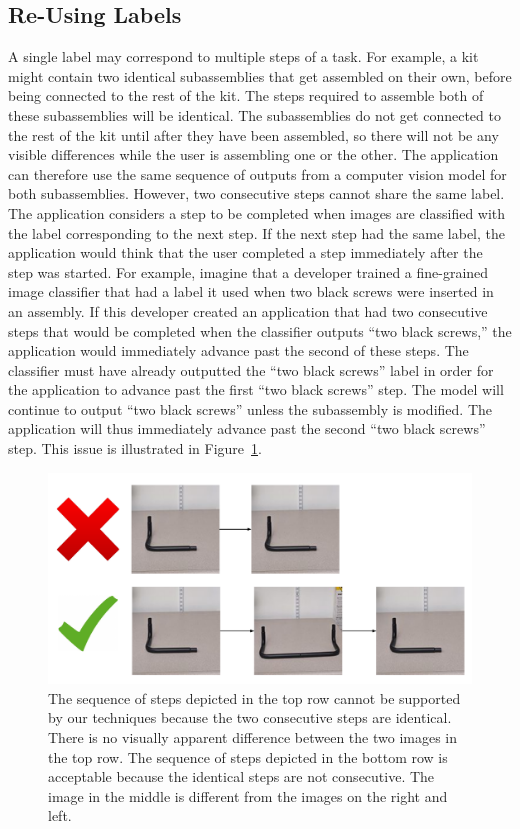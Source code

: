 \subsection{Re-Using Labels}

A single label may correspond to multiple steps of a task.
For example, a kit might contain two identical subassemblies that get assembled
on their own, before being connected to the rest of the kit.
The steps required to assemble both of these subassemblies will be identical.
The subassemblies do not get connected to the rest of the kit until after they
have been assembled, so there will not be any visible differences while the user
is assembling one or the other.
The application can therefore use the same sequence of outputs from a computer
vision model for both subassemblies.
However, two consecutive steps cannot share the same label.
The application considers a step to be completed when images are classified with
the label corresponding to the next step.
If the next step had the same label, the application would think that the user
completed a step immediately after the step was started.
For example, imagine that a developer trained a fine-grained image classifier
that had a label it used when two black screws were inserted in an assembly.
If this developer created an application that had two consecutive steps that
would be completed when the classifier outputs ``two black screws,'' the
application would immediately advance past the second of these steps.
The classifier must have already outputted the ``two black screws'' label in
order for the application to advance past the first ``two black screws'' step.
The model will continue to output ``two black screws'' unless the subassembly is
modified.
The application will thus immediately advance past the second
``two black screws'' step.
This issue is illustrated in Figure~\ref{fig:consec_step}.

\begin{figure}
  \includegraphics[width=\columnwidth]{figures/consec_step.pdf}
  \caption{
    The sequence of steps depicted in the top row cannot be supported by our
    techniques because the two consecutive steps are identical.
    There is no visually apparent difference between the two images in the top
    row.
    The sequence of steps depicted in the bottom row is acceptable because the
    identical steps are not consecutive.
    The image in the middle is different from the images on the right and left.
  }\label{fig:consec_step}
\end{figure}

